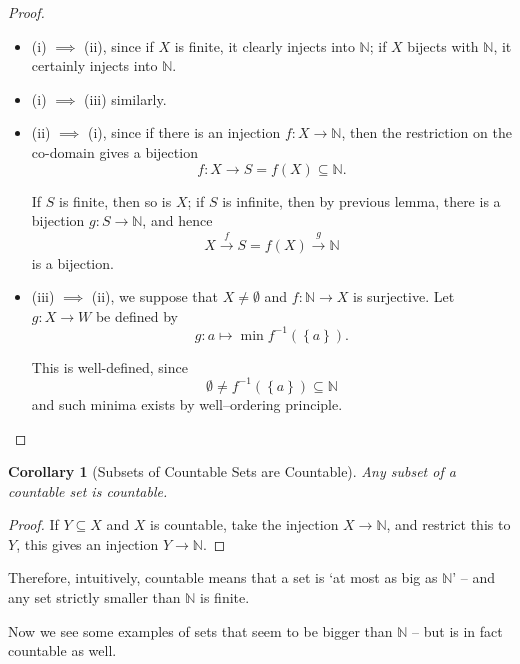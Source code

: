 \documentclass{article}
\newtheorem{corollary}[theorem]{Corollary}
\theoremstyle{definition}
\theoremstyle{remark}
\newcommand{\pqty}[1]{\left(#1\right)}
\newcommand{\Bqty}[1]{\left\{#1\right\}}
\newcommand{\functiondomain}[3]{#1:#2\to #3}
\newcommand{\functionmap}[3]{#1:#2\mapsto #3}
\newcommand{\inverse}{^{-1}}
\newcommand{\NN}{\mathbb{N}}
\begin{document}
\begin{proof}
    \begin{itemize}
        \item (i) \(\implies\) (ii), since if \(X\) is finite, it clearly injects into \(\NN\); if \(X\) bijects with \(\NN\), it certainly injects into \(\NN\).
        
        \item (i) \(\implies\) (iii) similarly.

        \item (ii) \(\implies\) (i), since if there is an injection \(\functiondomain{f}{X}{\NN}\), then the restriction on the co-domain gives a bijection
        \[
            \functiondomain{f}{X}{S = f\pqty{X} \subseteq \NN}.
        \]

        If \(S\) is finite, then so is \(X\); if \(S\) is infinite, then by previous lemma, there is a bijection \(\functiondomain{g}{S}{\NN}\), and hence
        \[
            X \xrightarrow{f} S = f\pqty{X} \xrightarrow{g} \NN
        \]
        is a bijection.

        \item (iii) \(\implies\) (ii), we suppose that \(X \neq \emptyset\) and \(\functiondomain{f}{\NN}{X}\) is surjective. Let \(\functiondomain{g}{X}{W}\) be defined by
        \[
            \functionmap{g}{a}{\min f\inverse\pqty{\Bqty{a}}}.
        \]

        This is well-defined, since
        \[
            \emptyset \neq f\inverse\pqty{\Bqty{a}} \subseteq \NN
        \]
        and such minima exists by well--ordering principle.
    \end{itemize}
\end{proof}

\begin{corollary}[Subsets of Countable Sets are Countable]
    Any subset of a countable set is countable.
\end{corollary}

\begin{proof}
    If \(Y \subseteq X\) and \(X\) is countable, take the injection \(X \to \NN\), and restrict this to \(Y\), this gives an injection \(Y \to \NN\).
\end{proof}

Therefore, intuitively, countable means that a set is `at most as big as \(\NN\)' -- and any set strictly smaller than \(\NN\) is finite.

Now we see some examples of sets that seem to be bigger than \(\NN\) -- but is in fact countable as well.
\end{document}

